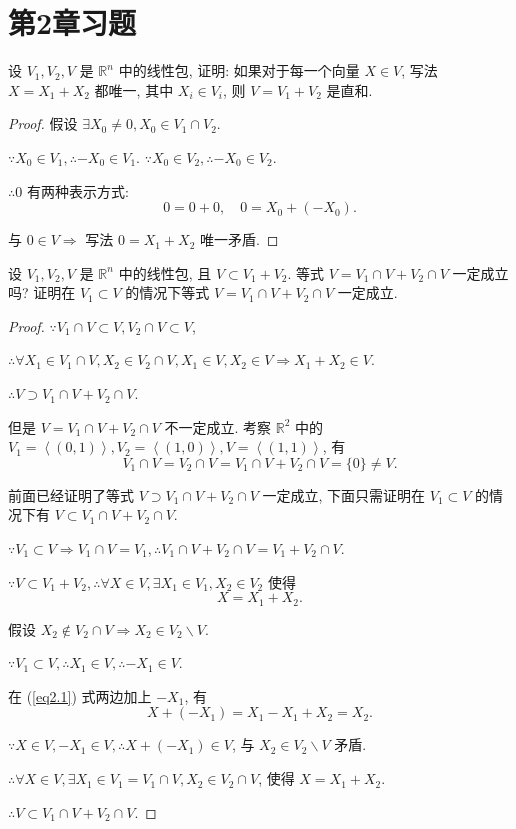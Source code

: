 \documentclass{ctexart}
\begin{document}
\section{第2章习题}
\begin{exercise}%
    设 $V_1,V_2,V$ 是 $\mathbb{R}^n$ 中的线性包, 证明: 如果对于每一个向量 $X\in V$, 写法 $X=X_1+X_2$ 都唯一, 其中 $X_i\in V_i$, 则 $V=V_1+V_2$ 是直和.
\end{exercise}
\begin{proof}
    假设 $\exists X_0\neq0,X_0\in V_1\cap V_2$.

    $\because X_0\in V_1,\therefore-X_0\in V_1$. $\because X_0\in V_2,\therefore-X_0\in V_2$.

    $\therefore0$ 有两种表示方式:
    \[0=0+0,\quad0=X_0+(-X_0).\]

    与 $0\in V\Rightarrow$ 写法 $0=X_1+X_2$ 唯一矛盾.
\end{proof}
\begin{exercise}%
    设 $V_1,V_2,V$ 是 $\mathbb{R}^n$ 中的线性包, 且 $V\subset V_1+V_2$. 等式 $V=V_1\cap V+V_2\cap V$ 一定成立吗? 证明在 $V_1\subset V$ 的情况下等式 $V=V_1\cap V+V_2\cap V$ 一定成立.
\end{exercise}
\begin{proof}
    $\because V_1\cap V\subset V,V_2\cap V\subset V$,

    $\therefore\forall X_1\in V_1\cap V,X_2\in V_2\cap V,X_1\in V,X_2\in V\Rightarrow X_1+X_2\in V$.

    $\therefore V\supset V_1\cap V+V_2\cap V$.

    但是 $V=V_1\cap V+V_2\cap V$ 不一定成立. 考察 $\mathbb{R}^2$ 中的 $V_1=\left<(0,1)\right>,V_2=\left<(1,0)\right>,V=\left<(1,1)\right>$, 有
    \[V_1\cap V=V_2\cap V=V_1\cap V+V_2\cap V=\{0\}\neq V.\]

    前面已经证明了等式 $V\supset V_1\cap V+V_2\cap V$ 一定成立, 下面只需证明在 $V_1\subset V$ 的情况下有 $V\subset V_1\cap V+V_2\cap V$.

    $\because V_1\subset V\Rightarrow V_1\cap V=V_1,\therefore V_1\cap V+V_2\cap V=V_1+V_2\cap V$.

    $\because V\subset V_1+V_2,\therefore\forall X\in V,\exists X_1\in V_1,X_2\in V_2$ 使得
    \begin{equation}\label{eq2.1}
        X=X_1+X_2.
    \end{equation}

    假设 $X_2\notin V_2\cap V\Rightarrow X_2\in V_2\backslash V$.

    $\because V_1\subset V,\therefore X_1\in V,\therefore-X_1\in V$.

    在 (\ref{eq2.1}) 式两边加上 $-X_1$, 有
    \[X+(-X_1)=X_1-X_1+X_2=X_2.\]

    $\because X\in V,-X_1\in V,\therefore X+(-X_1)\in V$, 与 $X_2\in V_2\backslash V$ 矛盾.

    $\therefore\forall X\in V,\exists X_1\in V_1=V_1\cap V,X_2\in V_2\cap V$, 使得 $X=X_1+X_2$.

    $\therefore V\subset V_1\cap V+V_2\cap V.$
\end{proof}
\end{document}

